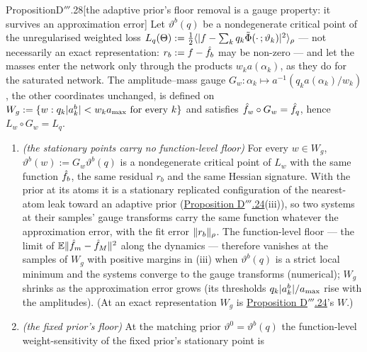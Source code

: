 \begin{thm}{Proposition}{D$'''$.28}[the adaptive prior's floor removal is a gauge property: it survives an
approximation error]\label{res:thmDppp:28}%
Let $\vartheta^b(q)$ be a nondegenerate critical point of the unregularised weighted loss
$L_q(\Theta) := \frac12\langle\lvert f - \sum_kq_k\tilde\Phi(\cdot\,;\vartheta_k)\rvert^2\rangle_\rho$ --- not necessarily an
exact representation: $r_b := f - \hat f_b$ may be non-zero --- and let the masses enter the network only through the
products $w_ka(\alpha_k)$, as they do for the saturated network. The amplitude--mass gauge
$G_w : \alpha_k\mapsto a^{-1}(q_ka(\alpha_k)/w_k)$, the other coordinates unchanged, is defined on
$W_g := \{w : q_k\lvert a^b_k\rvert < w_ka_{\max}\text{ for every }k\}$ and satisfies $\hat f_w\circ G_w = \hat f_q$, hence
$L_w\circ G_w = L_q$.
\begin{enumerate}[label=\textup{(\roman*)}]
  \item \emph{(the stationary points carry no function-level floor)} For every $w\in W_g$,
    $\vartheta^b(w) := G_w\vartheta^b(q)$ is a nondegenerate critical point of $L_w$ with the same function
    $\hat f_b$, the same residual $r_b$ and the same Hessian signature. With the prior at its atoms it is a stationary
    replicated configuration of the nearest-atom leak toward an adaptive prior
    (\hyperref[res:thmDppp:24]{Proposition D$'''$.24}(iii)), so two systems at their samples' gauge transforms carry
    the same function whatever the approximation error, with the fit error $\lVert r_b\rVert_\rho$. The function-level floor
    --- the limit of $\mathbb{E}\lVert \hat f_m - \hat f_M\rVert^2$ along the dynamics --- therefore vanishes at the samples of $W_g$
    with positive margins in (iii) when $\vartheta^b(q)$ is a strict local minimum and the systems converge to the
    gauge transforms (numerical); $W_g$ shrinks as the approximation error grows (its thresholds
    $q_k\lvert a^b_k\rvert/a_{\max}$ rise with the amplitudes). (At an exact representation $W_g$ is
    \hyperref[res:thmDppp:24]{Proposition D$'''$.24}'s $W$.)
  \item \emph{(the fixed prior's floor)} At the matching prior $\vartheta^0 = \vartheta^b(q)$ the function-level
    weight-sensitivity of the fixed prior's stationary point is

\end{enumerate}
\end{thm}

